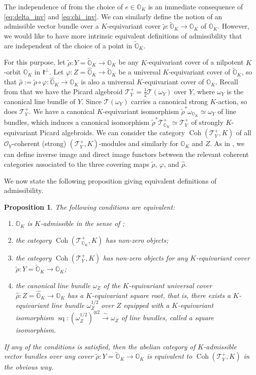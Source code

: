 \documentclass[11pt, a4paper]{amsart}
\newcommand{\orb}{\mathbb{O}}
\newcommand{\orbk}{\orb_{K}}
\newcommand{\torbk}{\widetilde{\orb}_{K}}
\newcommand{\horbk}{\widehat{\orb}_{K}}
\newcommand{\fk}{\mathfrak{k}}
\DeclareMathOperator{\sq}{sq}
\DeclareMathOperator{\Coh}{Coh}
\newcommand{\smallhalf}{{\scriptscriptstyle 1/2}}
\newcommand{\TT}{\mathscr{T}}
\newcommand{\OO}{\mathcal{O}}
\newtheorem{Prop}[Thm]{Proposition}
\theoremstyle{definition}
\numberwithin{equation}{section}
\begin{document}
The independence of  from the choice of $e \in \orbk$ is an immediate consequence of \eqref{eq:delta_inv} and \eqref{eq:chi_inv}. We can similarly define the notion of an admissible vector bundle over a $K$-equivariant cover $\tilde{\rho}: \torbk \to \orbk$ of $\orbk$. However, we would like to have more intrinsic equivalent definitions of admissibility that are independent of the choice of a point in $\torbk$. 

For this purpose, let $\tilde{\rho}: Y = \torbk \to \orbk$ be any $K$-equivariant cover of a nilpotent $K$-orbit $\orbk$ in $\fk^\perp$. Let $\varphi: Z=\horbk \to \torbk$ be a universal $K$-equivariant cover of $\torbk$, so that $\hat{\rho} := \tilde{\rho} \circ \varphi: \horbk \to \orbk$ is also a universal $K$-equivariant cover of $\orbk$. Recall from  that we have the Picard algebroid $\TT_Y^+ = \frac{1}{2} \TT(\omega_Y)$ over $Y$, where $\omega_Y$ is the canonical line bundle of $Y$. Since $\TT(\omega_Y)$ carries a canonical strong $K$-action, so does $\TT_Y^+$. We have a canonical $K$-equivariant isomorphism $\tilde{\rho}^* \omega_{\orbk} \simeq \omega_Y$ of line bundles, which induces a canonical isomorphism $\tilde{\rho}^* \TT_{\orbk}^+ \simeq \TT_Y^+$ of strongly $K$-equivariant Picard algebroids. 
We can consider the category $\Coh(\TT_Y^+, K)$ of all $\OO_Y$-coherent (strong) $(\TT_Y^+, K)$-modules and similarly for $\orbk$ and $Z$. As in , we can define inverse image and direct image functors between the relevant coherent categories associated to the three covering maps $\tilde{\rho}$, $\varphi$, and $\hat{\rho}$. 

We now state the following proposition giving equivalent definitions of admissibility.

\begin{Prop} \label{prop:adm_equivalent}
	The following conditions are equivalent:
	\begin{enumerate}[label=(\roman*)]
		\item $\orbk$ is $K$-admissible in the sense of ;
		\item the category $\Coh(\TT_{\orbk}^+, K)$ has non-zero objects;
		\item the category $\Coh(\TT_Y^+, K)$ has non-zero objects for any $K$-equivariant cover $\tilde{\rho}: Y = \torbk \to \orbk$;
		\item the canonical line bundle $\omega_Z$ of the $K$-equivariant universal cover $\hat{\rho}: Z=\horbk \to \orbk$ has a $K$-equivariant square root, that is, there exists a $K$-equivariant line bundle $\omega_Z^{\smallhalf}$ over $Z$ equipped with a $K$-equivariant isomorphism $\sq: (\omega_Z^{\smallhalf})^{\otimes 2} \xrightarrow{\,\sim\,} \omega_Z$ of line bundles, called a \emph{square isomorphism}.
	\end{enumerate}
	If any of the conditions is satisfied, then the abelian category of $K$-admissible vector bundles over any cover $\tilde{\rho}: Y = \torbk \to \orbk$ is equivalent to $\Coh(\TT_Y^+, K)$ in the obvious way.
\end{Prop}
\end{document}
